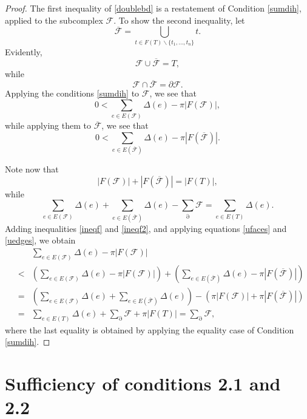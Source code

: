 \documentclass{acmart}
\newcommand{\thm}[2]{\begin{#1} #2 \end{#1}}
\begin{document}
\thm{proof}
{
The first inequality of \ref{doublebd} is a restatement of Condition
\ref{sumdih}, applied to the subcomplex $\mathcal{F}$. To show the
second inequality, let 
$$
\overline{\mathcal{F}} = \bigcup_{t \in F(T) \backslash \{t_1,
\ldots, t_n\}} t.
$$
Evidently, 
$$
\mathcal{F} \cup \overline{\mathcal{F}} = T,
$$
while
$$
\mathcal{F} \cap \overline{\mathcal{F}} = \partial\mathcal{F}.
$$
Applying the conditions \ref{sumdih} to $\mathcal{F}$, we see that
\begin{equation}
\label{ineqf}
0 < \sum_{e\in E(\mathcal{F})} \Delta(e) -  \pi |F(\mathcal{F})|,
\end{equation}
while applying them to $\overline{\mathcal{F}}$, we see that 
\begin{equation}
\label{ineqf2}
0 < \sum_{e\in E(\overline{\mathcal{F}})} \Delta(e) -  \pi
|F(\overline{\mathcal{F}})|. 
\end{equation}

Note now that 
\begin{equation}
\label{ufaces}
|F(\mathcal{F})| + |F(\overline{\mathcal{F}})| = |F(T)|,
\end{equation}
while
\begin{equation}
\label{uedges}
\sum_{e\in E(\mathcal{F})} \Delta(e)+ \sum_{e\in
  E(\overline{\mathcal{F}})} \Delta(e) - \sum_\partial \mathcal{F} =
\sum_{e\in E(T)} \Delta(e).
\end{equation}
Adding inequalities \ref{ineqf} and \ref{ineqf2}, and applying equations
\ref{ufaces} and \ref{uedges}, we obtain
\begin{eqnarray*}
 & &  \sum_{e\in E(\mathcal{F})} \Delta(e) -  \pi |F(\mathcal{F})| \\
 & < & \left(\sum_{e\in E(\mathcal{F})} \Delta(e) -  \pi |F(\mathcal{F})|\right) +
         \left(\sum_{e\in E(\overline{\mathcal{F}})} \Delta(e) -
         \pi|F(\overline{\mathcal{F}})|\right) \\
  & = & \left(\sum_{e\in E(\mathcal{F})} \Delta(e) + \sum_{e\in
    E(\overline{\mathcal{F}})} \Delta(e)\right) - \left(\pi |F(\mathcal{F})| +
         \pi|F(\overline{\mathcal{F}})|\right) \\
  & = & \sum_{e\in E(T)} \Delta(e) +  \sum_\partial \mathcal{F} + \pi
  |F(T)|  =  \sum_\partial\mathcal{F},
\end{eqnarray*}
where the last equality is obtained by applying the equality case of
Condition \ref{sumdih}. 
}

\section{Sufficiency of conditions 2.1 and 2.2}
\label{suff}
\end{document}
